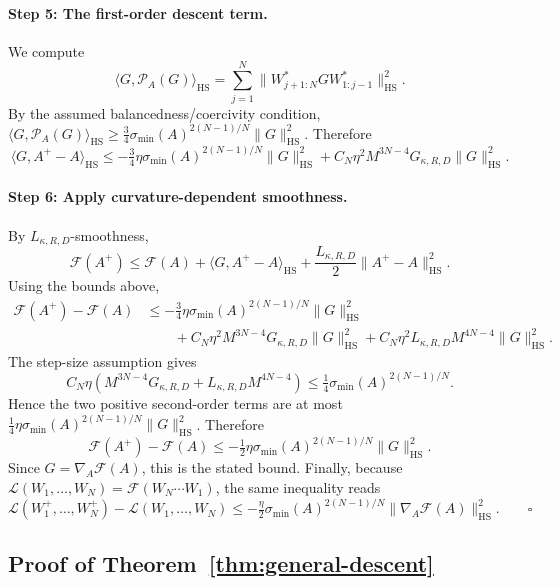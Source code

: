 \documentclass[letterpaper]{article}
\begin{document}
\paragraph{Step 5: The first-order descent term.}
We compute
\[
\langle G,\mathcal P_A(G)\rangle_{\mathrm{HS}}
=
\sum_{j=1}^N \|W_{j+1:N}^*GW_{1:j-1}^*\|_{\mathrm{HS}}^2.
\]
By the assumed balancedness/coercivity condition,
\(\langle G,\mathcal P_A(G)\rangle_{\mathrm{HS}} \geq \tfrac34
\sigma_{\min}(A)^{2(N-1)/N} \|G\|_{\mathrm{HS}}^2\). Therefore
\[
\langle G,A^+-A\rangle_{\mathrm{HS}}
\leq
- \tfrac34\eta \sigma_{\min}(A)^{2(N-1)/N} \|G\|_{\mathrm{HS}}^2
+
C_N\eta^2M^{3N-4}G_{\kappa,R,D} \|G\|_{\mathrm{HS}}^2.
\]

\paragraph{Step 6: Apply curvature-dependent smoothness.}
By \(L_{\kappa,R,D}\)-smoothness,
\[
\mathcal F(A^+)
\leq
\mathcal F(A)
+
\langle G,A^+-A\rangle_{\mathrm{HS}}
+
\frac{L_{\kappa,R,D}}2 \|A^+-A\|_{\mathrm{HS}}^2.
\]
Using the bounds above,
\[
\begin{aligned}
\mathcal F(A^+)-\mathcal F(A)
&\leq
- \tfrac34\eta \sigma_{\min}(A)^{2(N-1)/N} \|G\|_{\mathrm{HS}}^2
\\
&\qquad
+ C_N\eta^2M^{3N-4}G_{\kappa,R,D} \|G\|_{\mathrm{HS}}^2
+ C_N\eta^2L_{\kappa,R,D}M^{4N-4} \|G\|_{\mathrm{HS}}^2.
\end{aligned}
\]
The step-size assumption gives
\[
C_N\eta \left( M^{3N-4}G_{\kappa,R,D} + L_{\kappa,R,D}M^{4N-4} \right)
\leq \tfrac14 \sigma_{\min}(A)^{2(N-1)/N}.
\]
Hence the two positive second-order terms are at most \(\tfrac14\eta
\sigma_{\min}(A)^{2(N-1)/N} \|G\|_{\mathrm{HS}}^2\). Therefore
\[
\mathcal F(A^+)-\mathcal F(A)
\leq
- \tfrac12\eta \sigma_{\min}(A)^{2(N-1)/N} \|G\|_{\mathrm{HS}}^2.
\]
Since \(G=\nabla_A\mathcal F(A)\), this is the stated bound. Finally,
because \(\mathcal L(W_1,\dots,W_N)=\mathcal F(W_N\cdots W_1)\), the same
inequality reads
\[
\mathcal L(W_1^+,\dots,W_N^+) - \mathcal L(W_1,\dots,W_N)
\leq
- \tfrac{\eta}{2} \sigma_{\min}(A)^{2(N-1)/N}
\|\nabla_A\mathcal F(A)\|_{\mathrm{HS}}^2.
\qquad\square
\]

\subsection{Proof of Theorem~\ref{thm:general-descent}}
\label{sec:proof-general-descent}
\end{document}
